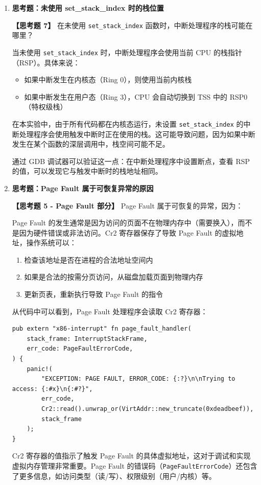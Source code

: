 \documentclass{SYSUReport}
\begin{document}
\begin{enumerate}[label={\chinese*、},labelsep=0pt, start=2]
    每个处理程序都会输出异常类型和栈帧信息，方便调试。对于带有错误码的异常（如 General Protection Fault、Page Fault），处理程序还会输出错误码的具体值。

    \item \textbf{思考题：未使用 set\_stack\_index 时的栈位置}

    \textbf{【思考题 7】} 在未使用 \texttt{set\_stack\_index} 函数时，中断处理程序的栈可能在哪里？

    当未使用 \texttt{set\_stack\_index} 时，中断处理程序会使用当前 CPU 的栈指针（RSP）。具体来说：
    \begin{itemize}
        \item 如果中断发生在内核态（Ring 0），则使用当前内核栈
        \item 如果中断发生在用户态（Ring 3），CPU 会自动切换到 TSS 中的 RSP0（特权级栈）
    \end{itemize}

    在本实验中，由于所有代码都在内核态运行，未设置 \texttt{set\_stack\_index} 的中断处理程序会使用触发中断时正在使用的栈。这可能导致问题，因为如果中断发生在某个函数的深层调用中，栈空间可能不足。

    通过 GDB 调试器可以验证这一点：在中断处理程序中设置断点，查看 RSP 的值，可以发现它与触发中断时的栈地址相同。

    \item \textbf{思考题：Page Fault 属于可恢复异常的原因}

    \textbf{【思考题 5 - Page Fault 部分】} Page Fault 属于可恢复的异常，因为：

    Page Fault 的发生通常是因为访问的页面不在物理内存中（需要换入），而不是因为硬件错误或非法访问。Cr2 寄存器保存了导致 Page Fault 的虚拟地址，操作系统可以：
    \begin{enumerate}
        \item 检查该地址是否在进程的合法地址空间内
        \item 如果是合法的按需分页访问，从磁盘加载页面到物理内存
        \item 更新页表，重新执行导致 Page Fault 的指令
    \end{enumerate}

    从代码中可以看到，Page Fault 处理程序会读取 Cr2 寄存器：

    \begin{verbatim}
pub extern "x86-interrupt" fn page_fault_handler(
    stack_frame: InterruptStackFrame,
    err_code: PageFaultErrorCode,
) {
    panic!(
        "EXCEPTION: PAGE FAULT, ERROR_CODE: {:?}\n\nTrying to access: {:#x}\n{:#?}",
        err_code,
        Cr2::read().unwrap_or(VirtAddr::new_truncate(0xdeadbeef)),
        stack_frame
    );
}
    \end{verbatim}

    Cr2 寄存器的值指示了触发 Page Fault 的具体虚拟地址，这对于调试和实现虚拟内存管理非常重要。Page Fault 的错误码（\texttt{PageFaultErrorCode}）还包含了更多信息，如访问类型（读/写）、权限级别（用户/内核）等。

\end{enumerate}
\end{document}
